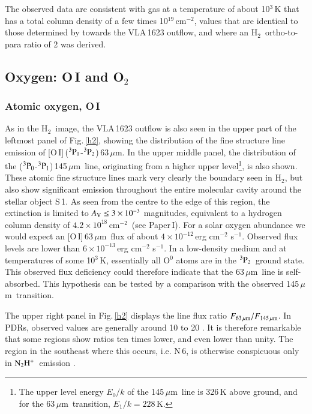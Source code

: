 \documentclass{aa}
\newcommand{\cmtwo}{cm$^{-2}$}
\newcommand{\ecs}{erg cm$^{-2}$ s$^{-1}$}
\newcommand{\um}{$\mu$m}                                 %
\newcommand{\molh}{H$_{2}$}                              %
\newcommand{\molo}{O$_{2}$}                     %
\newcommand{\powten}[1]{10$^{#1}$}
\newcommand{\pzero}{$^{3}{\rm P}_{0}$}
\newcommand{\pone}{$^{3}{\rm P}_{1}$}
\newcommand{\ptwo}{$^{3}{\rm P}_{2}$}
\newcommand{\ntwohp}{${\rm N_2H^+}$}
\begin{document}
The observed data are consistent with gas at a temperature of about \powten{3}\,K that has a total column density of  a few times \powten{19}\,\cmtwo, values that are identical to those determined by \citet{liseau2009} towards the VLA\,1623 outflow, and where an \molh\ ortho-to-para ratio of 2 was derived. 

\subsection{Oxygen: O\,I and \molo}

\subsubsection{Atomic oxygen, O\,I}

As in the \molh\  image, the VLA\,1623 outflow is also seen in the upper part of the leftmost panel of Fig.\,\ref{h2}, showing the distribution of the fine structure line emission of [O\,I]\,(\pone-\ptwo)\,63\,\um. In the upper middle panel,  the distribution of the (\pzero-\pone)\,145\,\um\ line, originating from a higher upper level\footnote{The upper level energy $E_0/k$ of the 145\,\um\ line is 326\,K above ground, and for the 63\,\um\ transition, $E_1/k=228$\,K.}, is also shown. These atomic fine structure lines mark very clearly the boundary seen in \molh, but also show significant emission throughout the entire molecular cavity around the stellar object S\,1. As seen from the centre to the edge of this region, the extinction is limited to $A_{\rm V} \le 3 \times 10^{-3}$ magnitudes, equivalent to a hydrogen column density of $4.2 \times 10^{18}$\,\cmtwo\ (see Paper\,I).  For a solar oxygen abundance \citep[$5 \times 10^{-4}$,][]{asplund2009} we would expect an [O\,I]\,63\,\um\ flux of about $4 \times 10^{-12}$\,\ecs. Observed flux levels are lower than $6\times 10^{-13}$\,\ecs. In a low-density medium and at temperatures of some \powten{3}\,K, essentially all O$^0$ atoms are in the \ptwo\ ground state. This observed flux deficiency could therefore indicate that the 63\,\um\ line is self-absorbed. This hypothesis can be tested by a comparison with the observed 145\,\um\ transition. 

The upper right panel in Fig.\,\ref{h2} displays the line flux ratio $F_{63\,\mu {\rm m}}/F_{145\,\mu {\rm m}}$. In PDRs, observed values are generally around 10 to 20 \citep{hollenbach1999}. It is therefore remarkable that some regions show ratios ten times lower, and even lower than unity. The region in the southeast where this occurs, i.e. N\,6, is otherwise conspicuous only in \ntwohp\ emission \citep[][and Paper\,I]{difrancesco2004}. 
\end{document}
